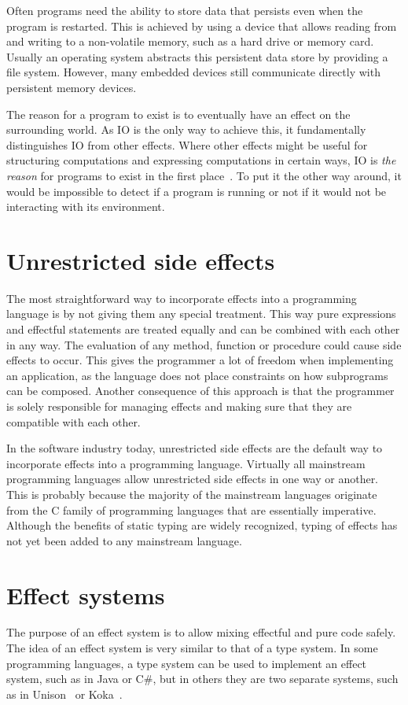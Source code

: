 Often programs need the ability to store data that persists even when the program is restarted. This is achieved by using a device that allows reading from and writing to a non-volatile memory, such as a hard drive or memory card. Usually an operating system abstracts this persistent data store by providing a file system. However, many embedded devices still communicate directly with persistent memory devices.

The reason for a program to exist is to eventually have an effect on the surrounding world. As IO is the only way to achieve this, it fundamentally distinguishes IO from other effects. Where other effects might be useful for structuring computations and expressing computations in certain ways, IO is \textit{the reason} for programs to exist in the first place~\cite{akward-squad}. To put it the other way around, it would be impossible to detect if a program is running or not if it would not be interacting with its environment.


\section{Unrestricted side effects}
The most straightforward way to incorporate effects into a programming language is by not giving them any special treatment. This way pure expressions and effectful statements are treated equally and can be combined with each other in any way. The evaluation of any method, function or procedure could cause side effects to occur. This gives the programmer a lot of freedom when implementing an application, as the language does not place constraints on how subprograms can be composed. Another consequence of this approach is that the programmer is solely responsible for managing effects and making sure that they are compatible with each other.

In the software industry today, unrestricted side effects are the default way to incorporate effects into a programming language. Virtually all mainstream programming languages allow unrestricted side effects in one way or another. This is probably because the majority of the mainstream languages originate from the C family of programming languages that are essentially imperative. Although the benefits of static typing are widely recognized, typing of effects has not yet been added to any mainstream language.


\section{Effect systems}\label{effects:effect-systems}
The purpose of an effect system is to allow mixing effectful and pure code safely. The idea of an effect system is very similar to that of a type system. In some programming languages, a type system can be used to implement an effect system, such as in Java or C\#, but in others they are two separate systems, such as in Unison~\cite{unison-lang} or Koka~\cite{koka-lang}.


